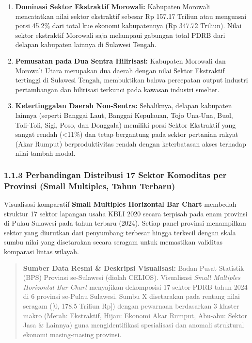 \documentclass[
]{article}
\providecommand{\tightlist}{%
  \setlength{\itemsep}{0pt}\setlength{\parskip}{0pt}}
\begin{document}
\begin{enumerate}
\def\labelenumi{\arabic{enumi}.}
\tightlist
\item
  \textbf{Dominasi Sektor Ekstraktif Morowali:} Kabupaten Morowali
  mencatatkan nilai sektor ekstraktif sebesar Rp 157.17 Triliun atau
  menguasai porsi 45.2\% dari total kue ekonomi kabupatennya (Rp 347.72
  Triliun). Nilai sektor ekstraktif Morowali saja melampaui gabungan
  total PDRB dari delapan kabupaten lainnya di Sulawesi Tengah.
\item
  \textbf{Pemusatan pada Dua Sentra Hilirisasi:} Kabupaten Morowali dan
  Morowali Utara merupakan dua daerah dengan nilai Sektor Ekstraktif
  tertinggi di Sulawesi Tengah, membuktikan bahwa percepatan output
  industri pertambangan dan hilirisasi terkunci pada kawasan industri
  smelter.
\item
  \textbf{Ketertinggalan Daerah Non-Sentra:} Sebaliknya, delapan
  kabupaten lainnya (seperti Banggai Laut, Banggai Kepulauan, Tojo
  Una-Una, Buol, Toli-Toli, Sigi, Poso, dan Donggala) memiliki porsi
  Sektor Ekstraktif yang sangat rendah (\textless11\%) dan tetap
  bergantung pada sektor pertanian rakyat (Akar Rumput) berproduktivitas
  rendah dengan keterbatasan akses terhadap nilai tambah modal.
\end{enumerate}

\subsubsection{1.1.3 Perbandingan Distribusi 17 Sektor Komoditas per
Provinsi (Small Multiples, Tahun
Terbaru)}\label{perbandingan-distribusi-17-sektor-komoditas-per-provinsi-small-multiples-tahun-terbaru}

Visualisasi komparatif \textbf{Small Multiples Horizontal Bar Chart}
membedah struktur 17 sektor lapangan usaha KBLI 2020 secara terpisah
pada enam provinsi di Pulau Sulawesi pada tahun terbaru (2024). Setiap
panel provinsi menampilkan sektor yang diurutkan dari penyumbang
terbesar hingga terkecil dengan skala sumbu nilai yang disetarakan
secara seragam untuk memastikan validitas komparasi lintas wilayah.

\begin{quote}
\textbf{Sumber Data Resmi \& Deskripsi Visualisasi:} Badan Pusat
Statistik (BPS) Provinsi se-Sulawesi (diolah CELIOS). Visualisasi
\emph{Small Multiples Horizontal Bar Chart} menyajikan dekomposisi 17
sektor PDRB tahun 2024 di 6 provinsi se-Pulau Sulawesi. Sumbu X
disetarakan pada rentang nilai seragam ({[}0, 178.5 Triliun Rp{]})
dengan pewarnaan berdasarkan 3 klaster makro (Merah: Ekstraktif, Hijau:
Ekonomi Akar Rumput, Abu-abu: Sektor Jasa \& Lainnya) guna
mengidentifikasi spesialisasi dan anomali struktural ekonomi
masing-masing provinsi.
\end{quote}
\end{document}

